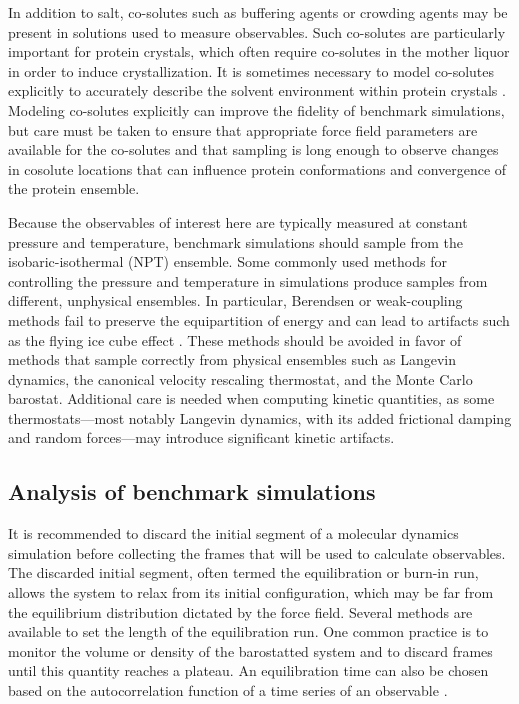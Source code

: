 \documentclass[9pt,review]{livecoms}
\begin{document}
In addition to salt, co-solutes such as buffering agents or crowding agents may be present in solutions used to measure observables.
Such co-solutes are particularly important for protein crystals, which often require co-solutes in the mother liquor in order to induce crystallization.
It is sometimes necessary to model co-solutes explicitly to accurately describe the solvent environment within protein crystals \cite{wall_biomolecular_2019}.
Modeling co-solutes explicitly can improve the fidelity of benchmark simulations, but care must be taken to ensure that appropriate force field parameters are available for the co-solutes and that sampling is long enough to observe changes in cosolute locations that can influence protein conformations and convergence of the protein ensemble.

Because the observables of interest here are typically measured at constant pressure and temperature, benchmark simulations should sample from the isobaric-isothermal (NPT) ensemble.
Some commonly used methods for controlling the pressure and temperature in simulations produce samples from different, unphysical ensembles.
In particular, Berendsen or weak-coupling methods fail to preserve the equipartition of energy and can lead to artifacts such as the flying ice cube effect \cite{harvey_flying_1998,braun_anomalous_2018}.
These methods should be avoided in favor of methods that sample correctly from physical ensembles such as Langevin dynamics, the canonical velocity rescaling thermostat, and the Monte Carlo barostat.
Additional care is needed when computing kinetic quantities, as some thermostats---most notably Langevin dynamics, with its added frictional damping and random forces---may introduce significant kinetic artifacts.

\subsection{Analysis of benchmark simulations}
\label{sub:best_practices_analysis}

It is recommended to discard the initial segment of a molecular dynamics simulation before collecting the frames that will be used to calculate observables.
The discarded initial segment, often termed the equilibration or burn-in run, allows the system to relax from its initial configuration, which may be far from the equilibrium distribution dictated by the force field.
Several methods are available to set the length of the equilibration run. 
One common practice is to monitor the volume or density of the barostatted system and to discard frames until this quantity reaches a plateau.
An equilibration time can also be chosen based on the autocorrelation function of a time series of an observable \cite{chodera_simple_2016}.
\end{document}
